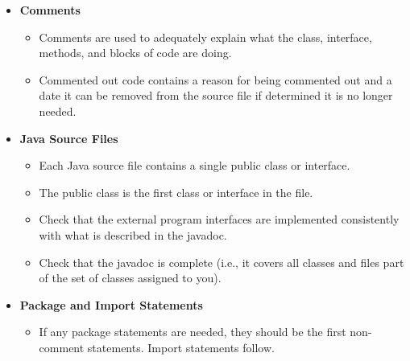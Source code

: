 \documentclass[\mainpath/main]{subfiles}
\begin{document}
\begin{itemize}
		\item \textbf{Comments}
		\begin{itemize}
			\item Comments are used to adequately explain what the class, interface, methods, and blocks of code are doing.
			\item Commented out code contains a reason for being commented out and a date it can be removed from the source file if determined it is no longer needed.
		\end{itemize}
		
		\item \textbf{Java Source Files}
		\begin{itemize}
			\item Each Java source file contains a single public class or interface.
			\item The public class is the first class or interface in the file.
			\item Check that the external program interfaces are implemented consistently
			with what is described in the javadoc.
			\item Check that the javadoc is complete (i.e., it covers all classes and files part
			of the set of classes assigned to you).
		\end{itemize}
		
		\item \textbf{Package and Import Statements}
		\begin{itemize}
			\item If any package statements are needed, they should be the first non- comment statements. Import statements follow.
		\end{itemize}
		

\end{itemize}
\end{document}
